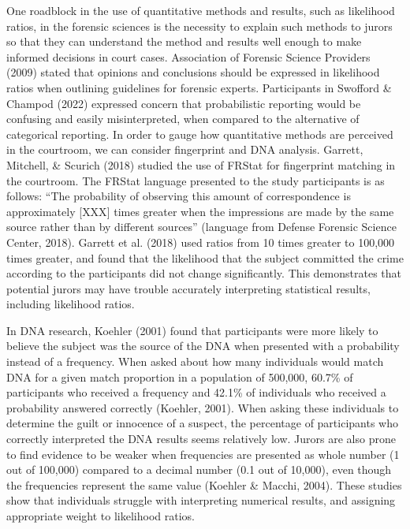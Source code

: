 \documentclass[print]{nuthesis}
\begin{document}
One roadblock in the use of quantitative methods and results, such as likelihood ratios, in the forensic sciences is the necessity to explain such methods to jurors so that they can understand the method and results well enough to make informed decisions in court cases.
Association of Forensic Science Providers (2009) stated that opinions and conclusions should be expressed in likelihood ratios when outlining guidelines for forensic experts.
Participants in Swofford \& Champod (2022) expressed concern that probabilistic reporting would be confusing and easily misinterpreted, when compared to the alternative of categorical reporting.
In order to gauge how quantitative methods are perceived in the courtroom, we can consider fingerprint and DNA analysis.
Garrett, Mitchell, \& Scurich (2018) studied the use of FRStat for fingerprint matching in the courtroom.
The FRStat language presented to the study participants is as follows: ``The probability of observing this amount of correspondence is approximately {[}XXX{]} times greater when the impressions are made by the same source rather than by different sources'' (language from Defense Forensic Science Center, 2018).
Garrett et al. (2018) used ratios from 10 times greater to 100,000 times greater, and found that the likelihood that the subject committed the crime according to the participants did not change significantly.
This demonstrates that potential jurors may have trouble accurately interpreting statistical results, including likelihood ratios.

In DNA research, Koehler (2001) found that participants were more likely to believe the subject was the source of the DNA when presented with a probability instead of a frequency.
When asked about how many individuals would match DNA for a given match proportion in a population of 500,000, 60.7\% of participants who received a frequency and 42.1\% of individuals who received a probability answered correctly (Koehler, 2001).
When asking these individuals to determine the guilt or innocence of a suspect, the percentage of participants who correctly interpreted the DNA results seems relatively low.
Jurors are also prone to find evidence to be weaker when frequencies are presented as whole number (1 out of 100,000) compared to a decimal number (0.1 out of 10,000), even though the frequencies represent the same value (Koehler \& Macchi, 2004).
These studies show that individuals struggle with interpreting numerical results, and assigning appropriate weight to likelihood ratios.
\end{document}

